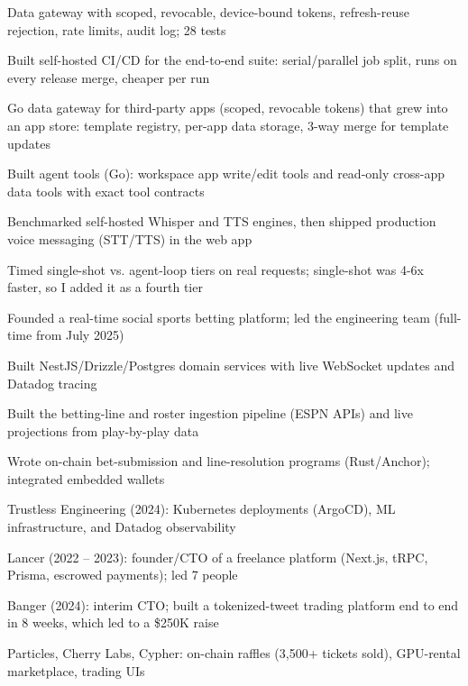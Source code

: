 \documentclass[print]{jack-resume}
\begin{document}
\begin{tightemize}
    \item Data gateway with scoped, revocable, device-bound tokens, refresh-reuse rejection, rate limits, audit log; 28 tests
    \item Built self-hosted CI/CD for the end-to-end suite: serial/parallel job split, runs on every release merge, cheaper per run
    \item Go data gateway for third-party apps (scoped, revocable tokens) that grew into an app store: template registry, per-app data storage, 3-way merge for template updates
    \item Built agent tools (Go): workspace app write/edit tools and read-only cross-app data tools with exact tool contracts
    \item Benchmarked self-hosted Whisper and TTS engines, then shipped production voice messaging (STT/TTS) in the web app
    \item Timed single-shot vs. agent-loop tiers on real requests; single-shot was 4-6x faster, so I added it as a fourth tier
\end{tightemize}
\sectionsep

\begin{tightemize}
    \item Founded a real-time social sports betting platform; led the engineering team (full-time from July 2025)
    \item Built NestJS/Drizzle/Postgres domain services with live WebSocket updates and Datadog tracing
    \item Built the betting-line and roster ingestion pipeline (ESPN APIs) and live projections from play-by-play data
    \item Wrote on-chain bet-submission and line-resolution programs (Rust/Anchor); integrated embedded wallets
\end{tightemize}
\sectionsep

\begin{tightemize}
    \item Trustless Engineering (2024): Kubernetes deployments (ArgoCD), ML infrastructure, and Datadog observability
    \item Lancer (2022 – 2023): founder/CTO of a freelance platform (Next.js, tRPC, Prisma, escrowed payments); led 7 people
    \item Banger (2024): interim CTO; built a tokenized-tweet trading platform end to end in 8 weeks, which led to a \$250K raise
    \item Particles, Cherry Labs, Cypher: on-chain raffles (3,500+ tickets sold), GPU-rental marketplace, trading UIs
\end{tightemize}
\sectionsep
\end{document}
